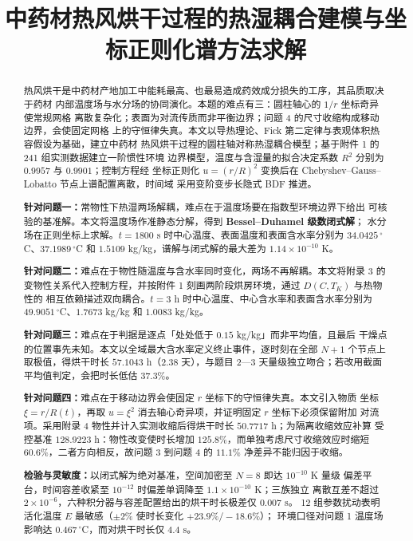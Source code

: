 \documentclass[withoutpreface,bwprint]{cumcmthesis}
\title{中药材热风烘干过程的热湿耦合建模与坐标正则化谱方法求解}
\begin{document}
\maketitle

\begin{abstract}
热风烘干是中药材产地加工中能耗最高、也最易造成药效成分损失的工序，其品质取决于药材
内部温度场与水分场的协同演化。本题的难点有三：圆柱轴心的 $1/r$ 坐标奇异使常规网格
离散复杂化；表面为对流传质而非平衡边界；问题 4 的尺寸收缩构成移动边界，会使固定网格
上的守恒律失真。本文以导热理论、Fick 第二定律与表观体积热容假设为基础，建立中药材
热风烘干过程的圆柱轴对称热湿耦合模型；基于附件 1 的 241 组实测数据建立一阶惯性环境
边界模型，温度与含湿量的拟合决定系数 $R^2$ 分别为 $0.9957$ 与 $0.9901$；控制方程经
坐标正则化 $u=(r/R)^2$ 变换后在 Chebyshev--Gauss--Lobatto 节点上谱配置离散，时间域
采用变阶变步长隐式 BDF 推进。

\textbf{针对问题一：}常物性下热湿两场解耦，难点在于温度场要在指数型环境边界下给出
可核验的基准解。本文将温度场作准静态分解，得到 \textbf{Bessel--Duhamel 级数闭式解}；
水分场在正则坐标上求解。$t=1800$ s 时中心温度、表面温度和表面含水率分别为
$34.0425\,^\circ$C、$37.1989\,^\circ$C 和 $1.5109$ kg/kg，谱解与闭式解的最大差为
$1.14\times10^{-10}$ K。

\textbf{针对问题二：}难点在于物性随温度与含水率同时变化，两场不再解耦。本文将附录 3
的变物性关系代入控制方程，并按附件 1 刻画两阶段烘房环境，通过 $D(C,T_K)$ 与热物性的
相互依赖描述双向耦合。$t=3$ h 时中心温度、中心含水率和表面含水率分别为
$49.9051\,^\circ$C、$1.7673$ kg/kg 和 $1.0083$ kg/kg。

\textbf{针对问题三：}难点在于判据是逐点「处处低于 $0.15$ kg/kg」而非平均值，且最后
干燥点的位置事先未知。本文以全域最大含水率定义终止事件，逐时刻在全部 $N+1$ 个节点上
取极值，得烘干时长 $57.1043$ h（$2.38$ 天），与题目 2—3 天量级独立吻合；若改用截面
平均值判定，会把时长低估 $37.3\%$。

\textbf{针对问题四：}难点在于移动边界会使固定 $r$ 坐标下的守恒律失真。本文引入物质
坐标 $\xi=r/R(t)$，再取 $u=\xi^2$ 消去轴心奇异项，并证明固定 $r$ 坐标下必须保留附加
对流项。采用附录 4 物性并计入实测收缩后得烘干时长 $50.7717$ h；为隔离收缩效应补算
受控基准 $128.9223$ h：物性改变使时长增加 $125.8\%$，而单独考虑尺寸收缩效应时缩短
$60.6\%$，二者方向相反，故问题 3 到问题 4 的 $11.1\%$ 净差异不能归因于收缩。

\textbf{检验与灵敏度：}以闭式解为绝对基准，空间加密至 $N=8$ 即达 $10^{-10}$ K 量级
偏差平台，时间容差收紧至 $10^{-12}$ 时偏差单调降至 $1.1\times10^{-10}$ K；三族独立
离散互差不超过 $2\times10^{-6}$，六种积分器与容差配置给出的烘干时长极差仅 $0.007$ s。
12 组参数扰动表明活化温度 $E$ 最敏感（$\pm2\%$ 使时长变化 $+23.9\%/-18.6\%$）；
环境口径对问题 1 温度场影响达 $0.467\,^\circ$C，而对烘干时长仅 $4.4$ s。

\end{abstract}
\end{document}
